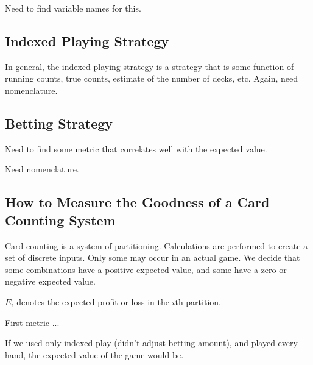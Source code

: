 Need to find variable names for this.


\subsection{Indexed Playing Strategy}
\label{cmct0:sctp0:sips0}

In general, the indexed playing strategy is a strategy that is some function of
running counts, true counts, estimate of the number of decks, etc.  Again,
need nomenclature.


\subsection{Betting Strategy}
\label{cmct0:sctp0:sibs0}

Need to find some metric that correlates well with the expected value.

Need nomenclature.


\subsection{How to Measure the Goodness of a Card Counting System}
\label{cmct0:sctp0:sgcs0}

Card counting is a system of partitioning.  Calculations are performed
to create a set of discrete inputs.  Only some may occur in an actual game.
We decide that some combinations have a positive expected value, and some have a
zero or negative expected value.

$E_i$ denotes the expected profit or loss in the $i$th partition.

First metric ...

If we used only indexed play (didn't adjust betting amount), and played every hand,
the expected value of the game would be.

